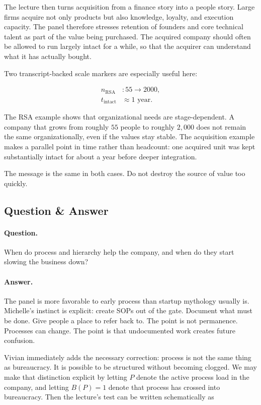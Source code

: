 The lecture then turns acquisition from a finance story into a people story. Large firms acquire not only products but also knowledge, loyalty, and execution capacity. The panel therefore stresses retention of founders and core technical talent as part of the value being purchased. The acquired company should often be allowed to run largely intact for a while, so that the acquirer can understand what it has actually bought.

Two transcript-backed scale markers are especially useful here:

\begin{align}
n_{\mathrm{RSA}} &: 55 \rightarrow 2000,\\
t_{\mathrm{intact}} &\approx 1\text{ year}.
\end{align}

The RSA example shows that organizational needs are stage-dependent. A company that grows from roughly \(55\) people to roughly \(2{,}000\) does not remain the same organizationally, even if the values stay stable. The acquisition example makes a parallel point in time rather than headcount: one acquired unit was kept substantially intact for about a year before deeper integration.

The message is the same in both cases. Do not destroy the source of value too quickly.

\subsection{Question \& Answer}

\paragraph{Question.} When do process and hierarchy help the company, and when do they start slowing the business down?

\paragraph{Answer.} The panel is more favorable to early process than startup mythology usually is. Michelle's instinct is explicit: create SOPs out of the gate. Document what must be done. Give people a place to refer back to. The point is not permanence. Processes can change. The point is that undocumented work creates future confusion.

Vivian immediately adds the necessary correction: process is not the same thing as bureaucracy. It is possible to be structured without becoming clogged. We may make that distinction explicit by letting \(P\) denote the active process load in the company, and letting \(B(P)=1\) denote that process has crossed into bureaucracy. Then the lecture's test can be written schematically as


